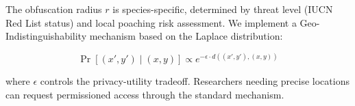 The obfuscation radius $r$ is species-specific, determined by threat level (IUCN Red List status) and local poaching risk assessment.
We implement a Geo-Indistinguishability mechanism based on the Laplace distribution:

\begin{equation}
    \Pr[(x', y') \mid (x, y)] \propto e^{-\epsilon \cdot d((x', y'), (x, y))}
\end{equation}

\noindent where $\epsilon$ controls the privacy-utility tradeoff.
Researchers needing precise locations can request permissioned access through the standard mechanism.

